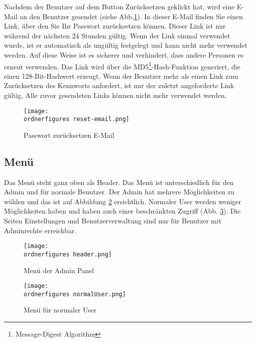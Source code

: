 Nachdem der Benutzer auf dem Button Zurücksetzen geklickt hat, wird eine E-Mail an den Benutzer gesendet (siehe Abb.\ref{fi:resetemail}). In dieser E-Mail finden Sie einen Link, über den Sie Ihr Passwort zurücksetzen können. Dieser Link ist nur während der nächsten 24 Stunden gültig. Wenn der Link einmal verwendet wurde, ist er automatisch als ungültig festgelegt und kann nicht mehr verwendet werden. Auf diese Weise ist es sicherer und verhindert, dass andere Personen es erneut verwenden. Das Link wird über die MD5\footnote{Message-Digest Algorithm }-Hash-Funktion generiert, die einen 128-Bit-Hashwert erzeugt. Wenn der Benutzer mehr als einen Link zum Zurücksetzen des Kennworts anfordert, ist nur der zuletzt angeforderte Link gültig. Alle zuvor gesendeten Links können nicht mehr verwendet werden.

\begin{figure}[H]
	\centering
	\texttt{[image: \\ordnerfigures reset-email.png]}
	\caption{Passwort zurücksetzen E-Mail}
	\label{fi:resetemail}
\end{figure}


\subsection{Menü}

Das Menü steht ganz oben als Header. Das Menü ist unterschiedlich für den Admin und für normale Benutzer. Der Admin hat mehrere Möglichkeiten zu wählen und das ist auf Abbildung \ref{fi:menu} ersichtlich. Normaler User werden weniger Möglichkeiten haben und haben auch einer beschränkten Zugriff (Abb. \ref{fi:normalerUser}). Die Seiten Einstellungen und Benutzerverwaltung sind nur für Benutzer mit Adminrechte erreichbar.

\begin{figure}[H]
	\centering
	\texttt{[image: \\ordnerfigures header.png]}
	\caption{Men\"u der Admin Panel}
	\label{fi:menu}
\end{figure}

\begin{figure}[H]
	\centering
	\texttt{[image: \\ordnerfigures normalUser.png]}
	\caption{Men\"u für normaler User}
	\label{fi:normalerUser}
\end{figure}




